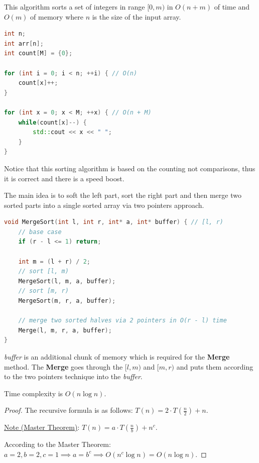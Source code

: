 
This algorithm sorts a set of integers in range $[0, m)$ in $O(n + m)$ of time and $O(m)$ of memory where $n$ is the size of the input array.

\begin{lstlisting}[language=C++]
int n;
int arr[n];
int count[M] = {0};

for (int i = 0; i < n; ++i) { // O(n)
    count[x]++;
}

for (int x = 0; x < M; ++x) { // O(n + M)
    while(count[x]--) {
        std::cout << x << " ";
    }
}

\end{lstlisting}

Notice that this sorting algorithm is based on the counting not comparisons, thus it is correct and there is a speed boost.



The main idea is to soft the left part, sort the right part and then merge two sorted parts into a single sorted array via two pointers approach.


\begin{lstlisting}[language=C++]
void MergeSort(int l, int r, int* a, int* buffer) { // [l, r)
    // base case
    if (r - l <= 1) return;

    int m = (l + r) / 2;
    // sort [l, m)
    MergeSort(l, m, a, buffer);
    // sort [m, r)
    MergeSort(m, r, a, buffer);

    // merge two sorted halves via 2 pointers in O(r - l) time
    Merge(l, m, r, a, buffer);
}
\end{lstlisting}

\textit{buffer} is an additional chunk of memory which is required for the \textbf{Merge} method. The \textbf{Merge} goes through the $[l, m)$ and $[m, r)$ and puts them according to the two pointers technique into the \textit{buffer}.

\begin{lemma}

    Time complexity is $O(n \log{n})$.

\end{lemma}

\begin{proof}
    The recursive formula is as follows: $T(n) = 2 \cdot T(\frac{n}{2}) + n$.

    \underline{Note (Master Theorem)}: $T(n) = a \cdot T(\frac{n}{b}) + n^c$.

    According to the Master Theorem: $a = 2, b = 2, c = 1 \implies a = b^c \implies O(n^c \log{n}) = O(n \log{n})$.

\end{proof}

